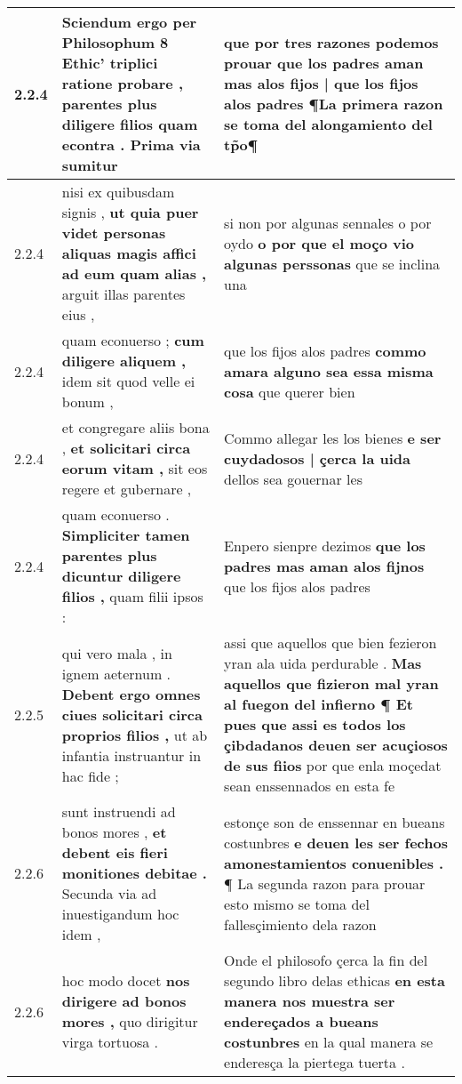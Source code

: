 \begin{tabular}{|p{1cm}|p{6.5cm}|p{6.5cm}|}
2.2.4 & Sciendum ergo per Philosophum 8 Ethic’ triplici ratione probare , \textbf{ parentes plus diligere filios quam econtra . } Prima via sumitur & que por tres razones podemos prouar \textbf{ que los padres aman mas alos fijos | que los fijos alos padres } ¶La primera razon se toma del alongamiento del tp̃o¶ \\\hline
2.2.4 & nisi ex quibusdam signis , \textbf{ ut quia puer videt personas aliquas magis affici ad eum quam alias , } arguit illas parentes eius , & si non por algunas sennales o por oydo \textbf{ o por que el moço vio algunas perssonas } que se inclina una \\\hline
2.2.4 & quam econuerso ; \textbf{ cum diligere aliquem , } idem sit quod velle ei bonum , & que los fijos alos padres \textbf{ commo amara alguno sea essa misma cosa } que querer bien \\\hline
2.2.4 & et congregare aliis bona , \textbf{ et solicitari circa eorum vitam , } sit eos regere et gubernare , & Commo allegar les los bienes \textbf{ e ser cuydadosos | çerca la uida } dellos sea gouernar les \\\hline
2.2.4 & quam econuerso . \textbf{ Simpliciter tamen parentes plus dicuntur diligere filios , } quam filii ipsos : & Enpero sienpre dezimos \textbf{ que los padres mas aman alos fijnos } que los fijos alos padres \\\hline
2.2.5 & qui vero mala , in ignem aeternum . \textbf{ Debent ergo omnes ciues solicitari circa proprios filios , } ut ab infantia instruantur in hac fide ; & assi que aquellos que bien fezieron yran ala uida perdurable . \textbf{ Mas aquellos que fizieron mal yran al fuegon del infierno ¶ Et pues que assi es todos los çibdadanos deuen ser acuçiosos de sus fiios } por que enla moçedat sean enssennados en esta fe \\\hline
2.2.6 & sunt instruendi ad bonos mores , \textbf{ et debent eis fieri monitiones debitae . } Secunda via ad inuestigandum hoc idem , & estonçe son de enssennar en bueans costunbres \textbf{ e deuen les ser fechos amonestamientos conuenibles . } ¶ La segunda razon para prouar esto mismo se toma del fallesçimiento dela razon \\\hline
2.2.6 & hoc modo docet \textbf{ nos dirigere ad bonos mores , } quo dirigitur virga tortuosa . & Onde el philosofo çerca la fin del segundo libro delas ethicas \textbf{ en esta manera nos muestra ser endereçados a bueans costunbres } en la qual manera se enderesça la piertega tuerta . \\\hline

\end{tabular}
